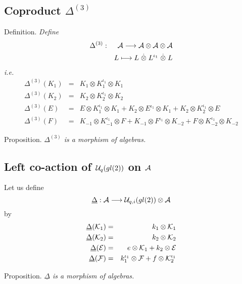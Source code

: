 \documentclass[a4paper,a4paper]{article}
\def\cA{{\cal A}}          \def\cB{{\cal B}}          \def\cC{{\cal C}}
\begin{document}
\subsection{Coproduct $\Delta^{(3)}$}
\medskip

\noindent
{\large \sc Definition.} \textsl{Define
\begin{eqnarray}
  \label{eq:Delta3}
  \Delta^{(3)} &:& \cA\longrightarrow \cA\otimes \cA \otimes \cA  \nonumber\\
  && L \longmapsto L \stackrel{.}{\otimes} L^{\iota_1}
  \stackrel{.}{\otimes} L 
\end{eqnarray}
i.e. 
\begin{eqnarray}
  \label{eq:Delta3gen}
  \Delta^{(3)}(K_1) &=& K_1 \otimes K_1^{\iota_1} \otimes K_1 \\
  \Delta^{(3)}(K_2) &=& K_2 \otimes K_2^{\iota_1} \otimes K_2 \\
  \Delta^{(3)}(E) &=& E \otimes K_1^{\iota_1} \otimes K_1
  + K_2 \otimes E^{\iota_1} \otimes K_1
  + K_2 \otimes K_2^{\iota_1} \otimes E \\
  \Delta^{(3)}(F) &=& K_{-1} \otimes K_{-1}^{\iota_1} \otimes F
  + K_{-1} \otimes F^{\iota_1} \otimes K_{-2}
  + F \otimes K_{-2}^{\iota_1}  \otimes K_{-2}
\end{eqnarray}
}
\medskip

\noindent
{\large \sc Proposition.} 
\textsl{$\Delta^{(3)}$ is a morphism of algebras. }

\subsection{Left co-action of ${\cal U}_q(gl(2))$ on $\cA$}

Let us define
\begin{equation}
  \label{eq:uDelta}
  \underline\Delta : \cA \longrightarrow \cU_{q,i}(gl(2)) \otimes \cA  
\end{equation}
by 
\begin{eqnarray}
  \label{eq:uDeltagen}
  \underline\Delta({\cal K}_1) &=& k_1 \otimes {\cal K}_1 \\
  \underline\Delta({\cal K}_2) &=& k_2 \otimes {\cal K}_2 \\
  \underline\Delta({\cal E}) &=& e \otimes {\cal K}_1 + k_2 \otimes {\cal E} \\
  \underline\Delta({\cal F}) &=& {k}_1^{\iota_1} \otimes {\cal F} + f \otimes 
{\cal K}_2^{\iota_1} 
\end{eqnarray}
\medskip

\noindent
{\large \sc Proposition.} 
\textsl{$\underline\Delta$ is a morphism of algebras.}
\end{document}
